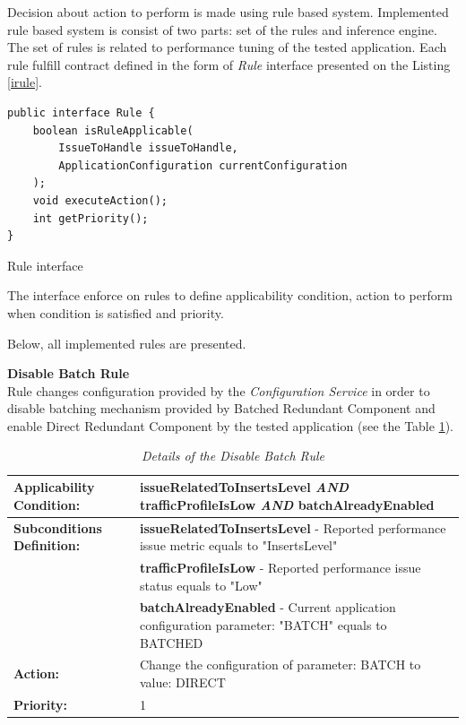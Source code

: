 \documentclass[10pt,a4paper]{article}
\begin{document}
Decision about action to perform is made using rule based system. Implemented rule based system is consist of two parts: set of  the rules and inference engine. The set of rules is related to performance tuning of the tested application. Each rule fulfill contract defined in the form of \textit{Rule} interface presented on the Listing \ref{irule}.

\begin{listing}[ht]\begin{verbatim}
public interface Rule {
    boolean isRuleApplicable(
    	IssueToHandle issueToHandle, 
    	ApplicationConfiguration currentConfiguration
    );
    void executeAction();
    int getPriority();
}
\end{verbatim}
\caption{Rule interface} \label{irule}
\end{listing}

The interface enforce on rules to define applicability condition, action to perform when condition is satisfied and priority.

Below, all implemented rules are presented.  

\noindent\textbf{Disable Batch Rule} \\
Rule changes configuration provided by the \textit{Configuration Service} in order to disable batching mechanism provided by Batched Redundant Component and enable Direct Redundant Component by the tested application (see the Table \ref{ruledisablebatch}).

\begin{table}[!htb]
\def\arraystretch{1.5}
\caption{\textit{Details of the Disable Batch Rule}} \label{ruledisablebatch}
\begin{tabularx}{\textwidth}{p{2.1cm}|X}

\textbf{Applicability Condition:} & \textbf{issueRelatedToInsertsLevel} \textit{AND} \newline
\textbf{trafficProfileIsLow} \textit{AND} \newline
\textbf{batchAlreadyEnabled} \\ \hline

\textbf{Subconditions Definition:} & \textbf{issueRelatedToInsertsLevel} -  Reported performance issue metric equals to "InsertsLevel"  \\
& \textbf{trafficProfileIsLow} - Reported performance issue status equals to "Low" \\
& \textbf{batchAlreadyEnabled} - Current application configuration parameter: "BATCH" equals to BATCHED \\ \hline

\textbf{Action:} & Change the configuration of parameter: BATCH to value: DIRECT\\ \hline
\textbf{Priority:} & 1\\
\end{tabularx}
\end{table}
\end{document}
